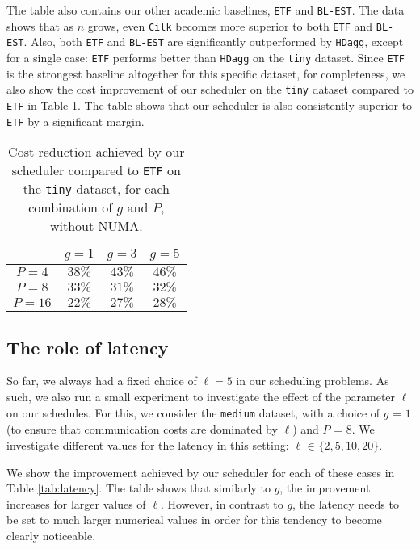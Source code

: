 \documentclass[sigconf,nonacm]{acmart}
\begin{document}
The table also contains our other academic baselines, \texttt{ETF} and \texttt{BL-EST}. The data shows that as $n$ grows, even \texttt{Cilk} becomes more superior to both \texttt{ETF} and \texttt{BL-EST}. Also, both \texttt{ETF} and \texttt{BL-EST} are significantly outperformed by \texttt{HDagg}, except for a single case: \texttt{ETF} performs better than \texttt{HDagg} on the \texttt{tiny} dataset. Since \texttt{ETF} is the strongest baseline altogether for this specific dataset, for completeness, we also show the cost improvement of our scheduler on the \texttt{tiny} dataset compared to \texttt{ETF} in Table \ref{tab:etf}. The table shows that our scheduler is also consistently superior to \texttt{ETF} by a significant margin.

\begin{table}
\centering
\caption{Cost reduction achieved by our scheduler compared to \texttt{ETF} on the \texttt{tiny} dataset, for each combination of $g$ and $P$, without NUMA.}
\renewcommand{\arraystretch}{1.65}
\begin{tabular}{c || c | c | c|}
  & $g=1$ & $g=3$ & $g=5$ \\ [0.5ex] 
 \hline\hline
 $P=4$ & $38\%$  & $43\%$ & $46\%$ \\ 
 \hline
 $P=8$ & $33\%$ & $31\%$ & $32\%$ \\
 \hline
 $P=16$ & $22\%$ & $27\%$ & $28\%$ \\
 \hline
\end{tabular}
\label{tab:etf}
\end{table}

\subsection{The role of latency}

So far, we always had a fixed choice of $\ell=5$ in our scheduling problems. As such, we also run a small experiment to investigate the effect of the parameter $\ell$ on our schedules. For this, we consider the \texttt{medium} dataset, with a choice of $g_{\!}=_{\!}1$ (to ensure that communication costs are dominated by $\ell$) and $P_{\!}=_{\!}8$. We investigate different values for the latency in this setting: $\ell _{\!} \in _{\!} \{ 2, 5, 10, 20\}$.

We show the improvement achieved by our scheduler for each of these cases in Table \ref{tab:latency}. The table shows that similarly to $g$, the improvement increases for larger values of $\ell$. However, in contrast to $g$, the latency needs to be set to much larger numerical values in order for this tendency to become clearly noticeable.
\end{document}
